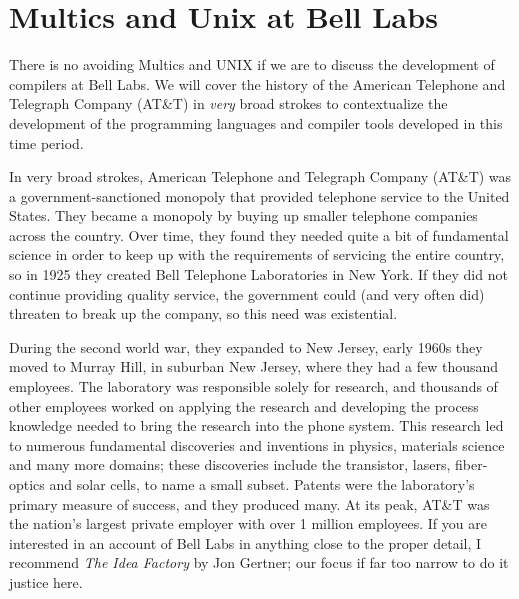 







\section{Multics and Unix at Bell Labs}

There is no avoiding Multics and UNIX if we are to discuss the development of compilers at Bell Labs.
We will cover the history of the American Telephone and Telegraph Company (AT\&T)
in \textit{very} broad strokes to contextualize the development of the programming languages
and compiler tools developed in this time period.

In very broad strokes, American Telephone and Telegraph Company (AT\&T) was a government-sanctioned
monopoly that provided telephone service to the United States.
They became a monopoly by buying up smaller telephone companies across the country.
Over time, they found they needed quite a bit of fundamental science in order to keep up with the
requirements of servicing the entire country, so in 1925 they created Bell Telephone
Laboratories in New York. If they did not continue providing quality service, the government could
(and very often did) threaten to break up the company, so this need was existential.

During the second world war, they expanded to New Jersey, early 1960s they moved to Murray Hill,
in suburban New Jersey, where they had a few thousand employees.
The laboratory was responsible solely for research, and thousands of other employees
worked on applying the research and developing the process knowledge needed to bring the
research into the phone system.
This research led to numerous fundamental discoveries and inventions in physics,
materials science and many more domains; these discoveries include the transistor, lasers,
fiber-optics and solar cells, to name a small subset.
Patents were the laboratory's primary measure of success, and they produced many.
At its peak, AT\&T was the nation's largest private employer with over 1 million employees.
If you are interested in an account of Bell Labs in anything close to the proper detail,
I recommend \textit{The Idea Factory} by Jon Gertner; our focus if far too narrow to do
it justice here.

